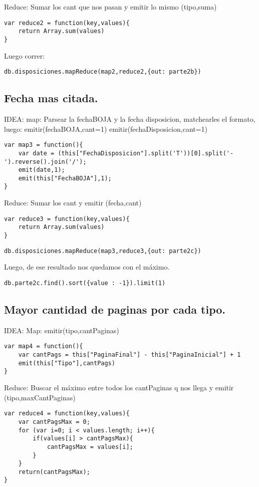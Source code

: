 Reduce:
Sumar los cant que nos pasan y emitir lo mismo (tipo,suma)
\begin{lstlisting}
var reduce2 = function(key,values){
	return Array.sum(values)
}
\end{lstlisting}
Luego correr: 
\begin{lstlisting}
db.disposiciones.mapReduce(map2,reduce2,{out: parte2b})
\end{lstlisting}

\subsection{Fecha mas citada.}

IDEA:
map:
Parsear la fechaBOJA y la fecha disposicion, matchearles el formato, luego:
emitir(fechaBOJA,cant=1)
emitir(fechaDisposicion,cant=1)

\begin{lstlisting}
var map3 = function(){
	var date = (this["FechaDisposicion"].split('T'))[0].split('-').reverse().join('/');
	emit(date,1);
	emit(this["FechaBOJA"],1);
}
\end{lstlisting}
Reduce:
Sumar los cant y emitir (fecha,cant)
\begin{lstlisting}
var reduce3 = function(key,values){
	return Array.sum(values)
}
\end{lstlisting}
\begin{lstlisting}
db.disposiciones.mapReduce(map3,reduce3,{out: parte2c})
\end{lstlisting}
Luego, de ese resultado nos quedamos con el máximo.
\begin{lstlisting}
db.parte2c.find().sort({value : -1}).limit(1)
\end{lstlisting}

\subsection{Mayor cantidad de paginas por cada tipo.}

IDEA:
Map: emitir(tipo,cantPaginas)
\begin{lstlisting}
var map4 = function(){
	var cantPags = this["PaginaFinal"] - this["PaginaInicial"] + 1
	emit(this["Tipo"],cantPags)
}
\end{lstlisting}
Reduce:
Buscar el máximo entre todos los cantPaginas q nos llega y emitir (tipo,maxCantPaginas)
\begin{lstlisting}
var reduce4 = function(key,values){
	var cantPagsMax = 0;
	for (var i=0; i < values.length; i++){
		if(values[i] > cantPagsMax){
			cantPagsMax = values[i];
		}
	}
	return(cantPagsMax);
}
\end{lstlisting}